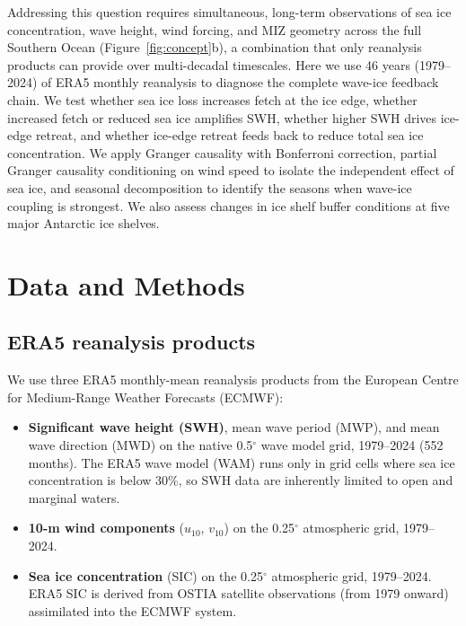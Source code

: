 \documentclass[11pt]{article}
\begin{document}
Addressing this question requires simultaneous, long-term observations of sea ice concentration, wave height, wind forcing, and MIZ geometry across the full Southern Ocean (Figure~\ref{fig:concept}b), a combination that only reanalysis products can provide over multi-decadal timescales. Here we use 46 years (1979--2024) of ERA5 monthly reanalysis to diagnose the complete wave-ice feedback chain. We test whether sea ice loss increases fetch at the ice edge, whether increased fetch or reduced sea ice amplifies SWH, whether higher SWH drives ice-edge retreat, and whether ice-edge retreat feeds back to reduce total sea ice concentration. We apply Granger causality with Bonferroni correction, partial Granger causality conditioning on wind speed to isolate the independent effect of sea ice, and seasonal decomposition to identify the seasons when wave-ice coupling is strongest. We also assess changes in ice shelf buffer conditions at five major Antarctic ice shelves.

\section{Data and Methods}
\label{sec:methods}

\subsection{ERA5 reanalysis products}

We use three ERA5 monthly-mean reanalysis products from the European Centre for Medium-Range Weather Forecasts (ECMWF)\cite{Hersbach2020}:

\begin{itemize}
\item \textbf{Significant wave height (SWH)}, mean wave period (MWP), and mean wave direction (MWD) on the native 0.5$^\circ$ wave model grid, 1979--2024 (552 months). The ERA5 wave model (WAM) runs only in grid cells where sea ice concentration is below 30\%, so SWH data are inherently limited to open and marginal waters.
\item \textbf{10-m wind components} ($u_{10}$, $v_{10}$) on the 0.25$^\circ$ atmospheric grid, 1979--2024.
\item \textbf{Sea ice concentration} (SIC) on the 0.25$^\circ$ atmospheric grid, 1979--2024. ERA5 SIC is derived from OSTIA satellite observations (from 1979 onward) assimilated into the ECMWF system.
\end{itemize}
\end{document}
